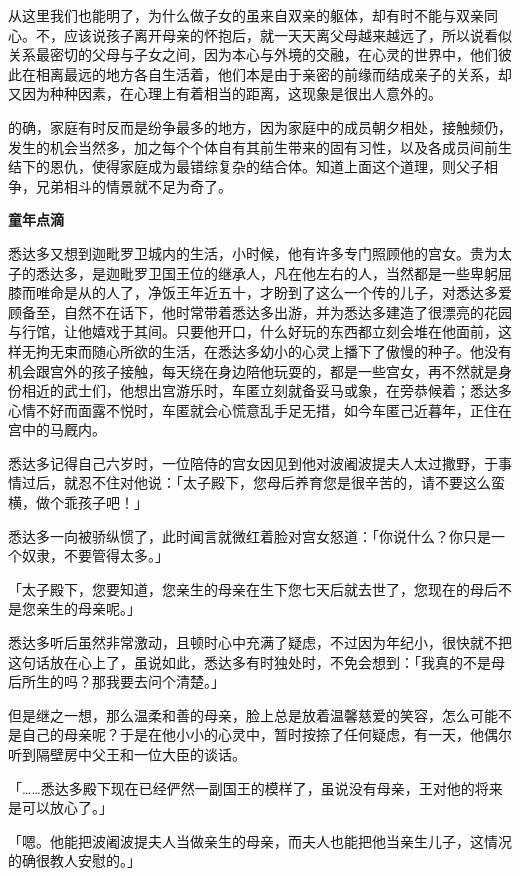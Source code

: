 \documentclass[twoside,openany]{book}
\newcommand{\mt}[1]{\textbullet \textbf{#1}}
\begin{document}
从这里我们也能明了，为什么做子女的虽来自双亲的躯体，却有时不能与双亲同心。不，应该说孩子离开母亲的怀抱后，就一天天离父母越来越远了，所以说看似关系最密切的父母与子女之间，因为本心与外境的交融，在心灵的世界中，他们彼此在相离最远的地方各自生活着，他们本是由于亲密的前缘而结成亲子的关系，却又因为种种因素，在心理上有着相当的距离，这现象是很出人意外的。

的确，家庭有时反而是纷争最多的地方，因为家庭中的成员朝夕相处，接触频仍，发生的机会当然多，加之每个个体自有其前生带来的固有习性，以及各成员间前生结下的恩仇，使得家庭成为最错综复杂的结合体。知道上面这个道理，则父子相争，兄弟相斗的情景就不足为奇了。

\mt{童年点滴}

悉达多又想到迦毗罗卫城内的生活，小时候，他有许多专门照顾他的宫女。贵为太子的悉达多，是迦毗罗卫国王位的继承人，凡在他左右的人，当然都是一些卑躬屈膝而唯命是从的人了，净饭王年近五十，才盼到了这么一个传的儿子，对悉达多爱顾备至，自然不在话下，他时常带着悉达多出游，并为悉达多建造了很漂亮的花园与行馆，让他嬉戏于其间。只要他开口，什么好玩的东西都立刻会堆在他面前，这样无拘无束而随心所欲的生活，在悉达多幼小的心灵上播下了傲慢的种子。他没有机会跟宫外的孩子接触，每天绕在身边陪他玩耍的，都是一些宫女，再不然就是身份相近的武士们，他想出宫游乐时，车匿立刻就备妥马或象，在旁恭候着；悉达多心情不好而面露不悦时，车匿就会心慌意乱手足无措，如今车匿己近暮年，正住在宫中的马厩内。

悉达多记得自己六岁时，一位陪侍的宫女因见到他对波阇波提夫人太过撒野，于事情过后，就忍不住对他说：「太子殿下，您母后养育您是很辛苦的，请不要这么蛮横，做个乖孩子吧！」

悉达多一向被骄纵惯了，此时闻言就微红着脸对宫女怒道：「你说什么？你只是一个奴隶，不要管得太多。」

「太子殿下，您要知道，您亲生的母亲在生下您七天后就去世了，您现在的母后不是您亲生的母亲呢。」

悉达多听后虽然非常激动，且顿时心中充满了疑虑，不过因为年纪小，很快就不把这句话放在心上了，虽说如此，悉达多有时独处时，不免会想到：「我真的不是母后所生的吗？那我要去问个清楚。」

但是继之一想，那么温柔和善的母亲，脸上总是放着温馨慈爱的笑容，怎么可能不是自己的母亲呢？于是在他小小的心灵中，暂时按捺了任何疑虑，有一天，他偶尔听到隔壁房中父王和一位大臣的谈话。

「……悉达多殿下现在已经俨然一副国王的模样了，虽说没有母亲，王对他的将来是可以放心了。」

「嗯。他能把波阇波提夫人当做亲生的母亲，而夫人也能把他当亲生儿子，这情况的确很教人安慰的。」
\end{document}
